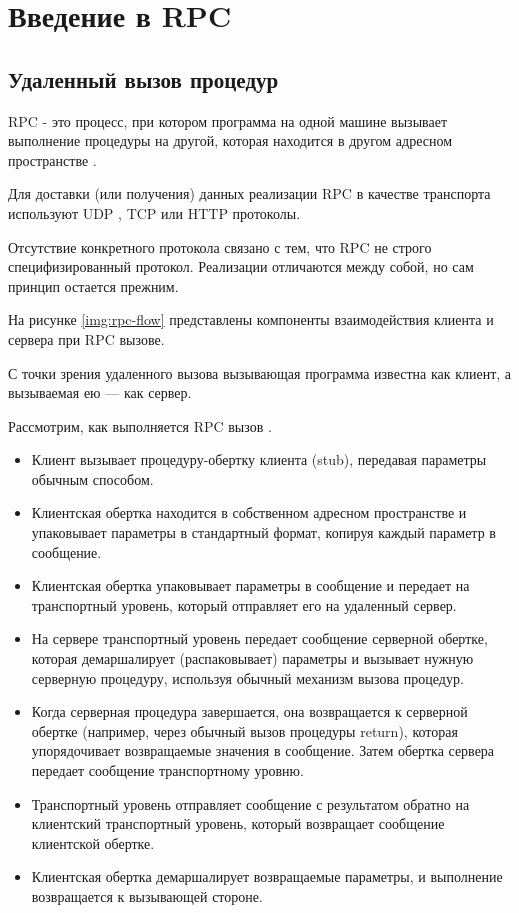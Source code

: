 \chapter{Введение в RPC}

\section{Удаленный вызов процедур}

RPC - это процесс, при котором программа на одной машине вызывает выполнение процедуры на другой, которая находится в другом адресном пространстве \cite{ibm-rpc}. 

Для доставки (или получения) данных реализации RPC в качестве транспорта используют UDP \cite{udp-info}, TCP \cite{tcp-info} или HTTP \cite{http-info} протоколы.

Отсутствие конкретного протокола связано с тем, что RPC не строго специфизированный протокол. Реализации отличаются между собой, но сам принцип остается прежним.  

На рисунке \ref{img:rpc-flow} представлены компоненты взаимодействия клиента и сервера при RPC вызове. 

С точки зрения удаленного вызова вызывающая программа известна как клиент, а вызываемая ею — как сервер.

Рассмотрим, как выполняется RPC вызов \cite{rpc-flow}.  

\begin{itemize}
\item Клиент вызывает процедуру-обертку клиента (stub), передавая параметры обычным способом. 
\item Клиентская обертка находится в собственном адресном пространстве и упаковывает параметры в стандартный формат, копируя каждый параметр в сообщение. 
\item Клиентская обертка упаковывает параметры в сообщение и передает на транспортный уровень, который отправляет его на удаленный сервер.
\item На сервере транспортный уровень передает сообщение серверной обертке, которая демаршалирует (распаковывает) параметры и вызывает нужную серверную процедуру, используя обычный механизм вызова процедур. 
\item Когда серверная процедура завершается, она возвращается к серверной обертке (например, через обычный вызов процедуры return), которая упорядочивает возвращаемые значения в сообщение. Затем обертка сервера передает сообщение транспортному уровню. 
\item Транспортный уровень отправляет сообщение с результатом обратно на клиентский транспортный уровень, который возвращает сообщение клиентской обертке. 
\item Клиентская обертка демаршалирует возвращаемые параметры, и выполнение возвращается к вызывающей стороне.
\end{itemize}

